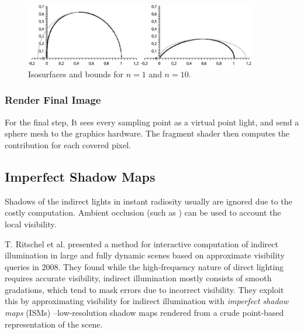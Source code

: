 \begin{figure}\label{f:splatting-indirect-illumination-7}
	\begin{center}
		\includegraphics[width=0.9\textwidth]{graphics/ir/ir-3-7}
	\end{center}
	\caption{Isosurfaces and bounds for $n = 1$ and $n = 10$.}
\end{figure}



\subsubsection{Render Final Image}
For the final step, It sees every sampling point as a virtual point light, and send a sphere mesh to the graphics hardware. The fragment shader then computes the contribution for each covered pixel. 





\subsection{Imperfect Shadow Maps}
Shadows of the indirect lights in instant radiosity usually are ignored due to the costly computation. Ambient occlusion (such as \cite{a:DynamicAmbientOcclusionandIndirectLighting}) can be used to account the local visibility. 

T. Ritschel et al. presented a method for interactive computation of indirect illumination in large and fully dynamic scenes based on approximate visibility queries in 2008. They found while the high-frequency nature of direct lighting requires accurate visibility, indirect illumination mostly consists of smooth gradations, which tend to mask errors due to incorrect visibility. They exploit this by approximating visibility for indirect illumination with \textit{imperfect shadow maps} (ISMs)\cite{a:ImperfectShadowMapsforEfficientComputationofIndirectIllumination} --low-resolution shadow maps rendered from a crude point-based representation of the scene.



